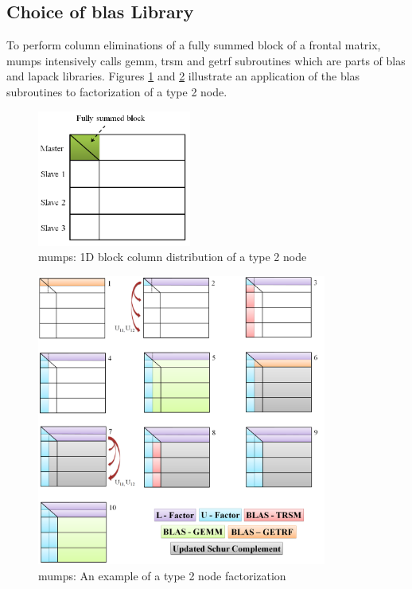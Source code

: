 \subsection{Choice of \gls{blas} Library}
\label{subseq:blas-comparison}


To perform column eliminations of a fully summed block of a frontal matrix, \gls{mumps} intensively calls \gls{gemm}, \gls{trsm} and \gls{getrf} subroutines which are parts of \gls{blas} and \gls{lapack} libraries. Figures \ref{fig:mumps:type-2-frontal-matrix} and  \ref{fig:mumps:steps-of-type-2-factorization} illustrate an application of the \gls{blas} subroutines to factorization of a type 2 node.\\


\figpointer{\ref{fig:mumps:type-2-frontal-matrix}}
\begin{figure}[htpb]
  \centering
  \includegraphics[width=0.45\textwidth]{figures/chapter-2/mumps-type-2-frontal-matrix.png}
\caption{\gls{mumps}: 1D block column distribution of a type 2 node}
\label{fig:mumps:type-2-frontal-matrix}
\end{figure}


\figpointer{\ref{fig:mumps:steps-of-type-2-factorization}}
\begin{figure}[htpb]
  \centering
  \includegraphics[width=0.85\textwidth]{figures/chapter-2/mumps-type-2-part-1.png}
\caption{\gls{mumps}: An example of a type 2 node factorization}
\label{fig:mumps:steps-of-type-2-factorization}
\end{figure}


